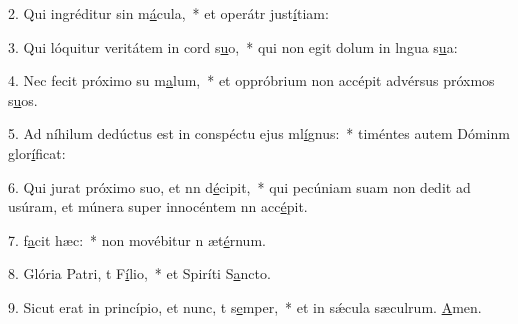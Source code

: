 2. Qui ingréditur sin m\uline{á}cula,~* et operátr just\uline{í}tiam:\par 
3. Qui lóquitur veritátem in cord s\uline{u}o,~* qui non egit dolum in lngua s\uline{u}a:\par 
4. Nec fecit próximo su m\uline{a}lum,~* et oppróbrium non accépit advérsus próxmos s\uline{u}os.\par 
5. Ad níhilum dedúctus est in conspéctu ejus ml\uline{í}gnus:~* timéntes autem Dóminm glor\uline{í}ficat:\par 
6. Qui jurat próximo suo, et nn d\uline{é}cipit,~* qui pecúniam suam non dedit ad usúram, et múnera super innocéntem nn acc\uline{é}pit.\par 
7.  f\uline{a}cit hæc:~* non movébitur n æt\uline{é}rnum.\par 
8. Glória Patri, t F\uline{í}lio,~* et Spiríti S\uline{a}ncto.\par 
9. Sicut erat in princípio, et nunc, t s\uline{e}mper,~* et in sǽcula sæculrum. \uline{A}men.\par 
